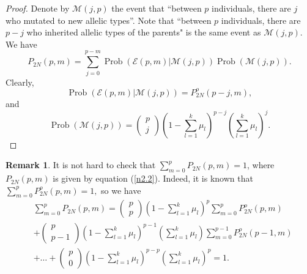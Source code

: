 \documentclass[12pt]{amsart}
\theoremstyle{definition}
\newtheorem{rem}[thm]{Remark}
\numberwithin{equation}{section}
\DeclareMathOperator{\Prob}{Prob}
\begin{document}
\begin{proof}
Denote by $\mathcal{M}(j,p)$
the event that ``between $p$ individuals, there are $j$ who mutated to new allelic types''. Note that ``between $p$ individuals, there are $p-j$ who inherited allelic types of the parents" is the same event as $\mathcal{M}(j,p)$.
We have
\begin{equation}
P_{2N}(p,m)=\sum\limits_{j=0}^{p-m}\Prob\left(\mathcal{E}(p,m)|
\mathcal{M}(j,p)\right)\Prob\left(\mathcal{M}(j,p)\right).
\end{equation}
Clearly,
$$
\Prob\left(\mathcal{E}(p,m)|
\mathcal{M}(j,p)\right)=P_{2N}^{o}(p-j,m),
$$
and
$$
\Prob\left(\mathcal{M}(j,p)\right)=\left(\begin{array}{c}
  p \\
  j
\end{array}\right)\left(1-\sum\limits_{l=1}^k\mu_l\right)^{p-j}
\left(\sum\limits_{l=1}^k\mu_l\right)^j.
$$
\end{proof}
\begin{rem}It is not hard to check that $\sum\limits_{m=0}^{p}P_{2N}(p,m)=1$,
where $P_{2N}(p,m)$ is given by equation (\ref{n2.2}). Indeed,
it is known that
$
\sum\limits_{m=0}^pP_{2N}^{o}(p,m)=1,
$
so we have
\begin{equation}
\begin{split}
&\sum\limits_{m=0}^pP_{2N}(p,m)
=\left(\begin{array}{c}
  p \\
  p
\end{array}\right)\left(1-\sum\limits_{l=1}^k\mu_l\right)^{p}
\sum\limits_{m=0}^pP_{2N}^{o}(p,m)\\
&+\left(\begin{array}{c}
  p \\
  p-1
\end{array}\right)\left(1-\sum\limits_{l=1}^k\mu_l\right)^{p-1}
\left(\sum\limits_{l=1}^k\mu_l\right)\sum\limits_{m=0}^{p-1}P_{2N}^{o}(p-1,m)\\
&+\ldots+\left(\begin{array}{c}
  p \\
  0
\end{array}\right)\left(1-\sum\limits_{l=1}^k\mu_l\right)^{p-p}
\left(\sum\limits_{l=1}^k\mu_l\right)^p=1.
\end{split}
\end{equation}
\end{rem}
\end{document}
